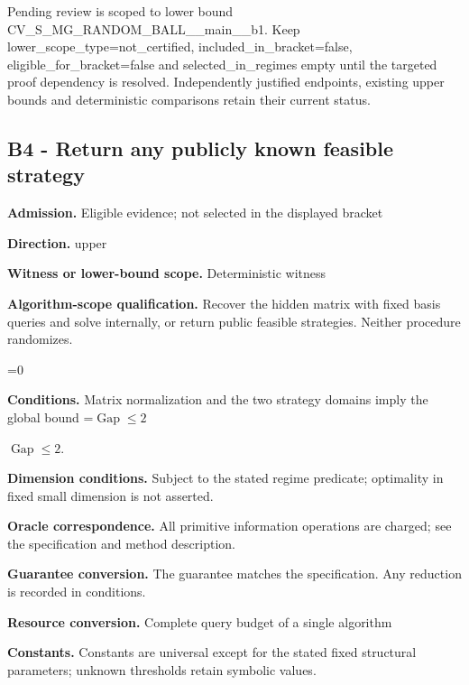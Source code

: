 \documentclass[10pt,a4paper]{article}
\newcommand{\AtlasMath}[1]{\par\begingroup\centering\setbox0=\hbox{$\displaystyle #1$}\ifdim\wd0>1.4\linewidth\typeout{ATLAS WIDE FORMULA: \the\wd0}\fi\ifdim\wd0>\linewidth\resizebox{\linewidth}{!}{\box0}\else\box0\fi\par\endgroup}
\newcommand{\AtlasInlineMath}[1]{\begingroup\setbox0=\hbox{$#1$}\ifdim\wd0>.4\linewidth\endgroup\AtlasMath{#1}\else\endgroup$#1$\fi}
\begin{document}
Pending review is scoped to lower bound CV\_S\_MG\_RANDOM\_BALL\_\_main\_\_b1. Keep lower\_scope\_type=not\_certified, included\_in\_bracket=false, eligible\_for\_bracket=false and selected\_in\_regimes empty until the targeted proof dependency is resolved. Independently justified endpoints, existing upper bounds and deterministic comparisons retain their current status.



\subsection{B4 - Return any publicly known feasible strategy}


\textbf{Admission.} Eligible evidence; not selected in the displayed bracket



\textbf{Direction.} upper



\textbf{Witness or lower-bound scope.} Deterministic witness



\textbf{Algorithm-scope qualification.} Recover the hidden matrix with fixed basis queries and solve internally, or return public feasible strategies. Neither procedure randomizes.



\AtlasMath{0}


\textbf{Conditions.} Matrix normalization and the two strategy domains imply the global bound \AtlasInlineMath{\operatorname{Gap}\le2}.



\textbf{Dimension conditions.} Subject to the stated regime predicate; optimality in fixed small dimension is not asserted.



\textbf{Oracle correspondence.} All primitive information operations are charged; see the specification and method description.



\textbf{Guarantee conversion.} The guarantee matches the specification. Any reduction is recorded in conditions.



\textbf{Resource conversion.} Complete query budget of a single algorithm



\textbf{Constants.} Constants are universal except for the stated fixed structural parameters; unknown thresholds retain symbolic values.
\end{document}
